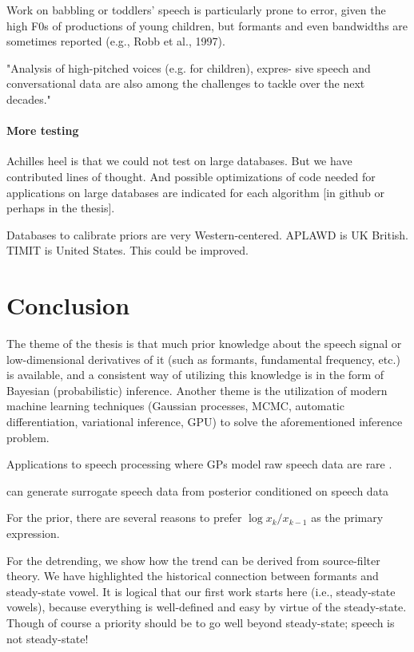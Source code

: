Work on babbling or toddlers’ speech is particularly
prone to error, given the high F0s of productions of young
children, but formants and even bandwidths are sometimes
reported (e.g., Robb et al., 1997). \citep[][p.~939]{Whalen2022}

"Analysis of high-pitched voices (e.g. for children), expres-
sive speech and conversational data are also among the challenges to tackle
over the next decades." \citep{Drugman2019}

\paragraph{More testing}

Achilles heel is that we could not test on large databases.
But we have contributed lines of thought.
And possible optimizations of code needed for applications on large databases are indicated for each algorithm [in github or perhaps in the thesis].

Databases to calibrate priors are very Western-centered.
APLAWD is UK British.
TIMIT is United States.
This could be improved.

\section{Conclusion}

The theme of the thesis is that much prior knowledge about the speech signal or low-dimensional derivatives of it (such as formants, fundamental frequency, etc.) is available, and a consistent way of utilizing this knowledge is in the form of Bayesian (probabilistic) inference. Another theme is the utilization of modern machine learning techniques (Gaussian processes, MCMC, automatic differentiation, variational inference, GPU) to solve the aforementioned inference problem.

Applications to speech processing where GPs model raw speech data are rare \citep{Koriyama2020}.

can generate surrogate speech data from posterior conditioned on speech data

For the prior, there are several reasons to prefer $\log x_k/x_{k-1}$ as the primary expression.

For the detrending, we show how the trend can be derived from source-filter theory.
We have highlighted the historical connection between formants and steady-state vowel.
It is logical that our first work starts here (i.e., steady-state vowels), because everything is well-defined and easy by virtue of the steady-state.
Though of course a priority should be to go well beyond steady-state; speech is not steady-state!

